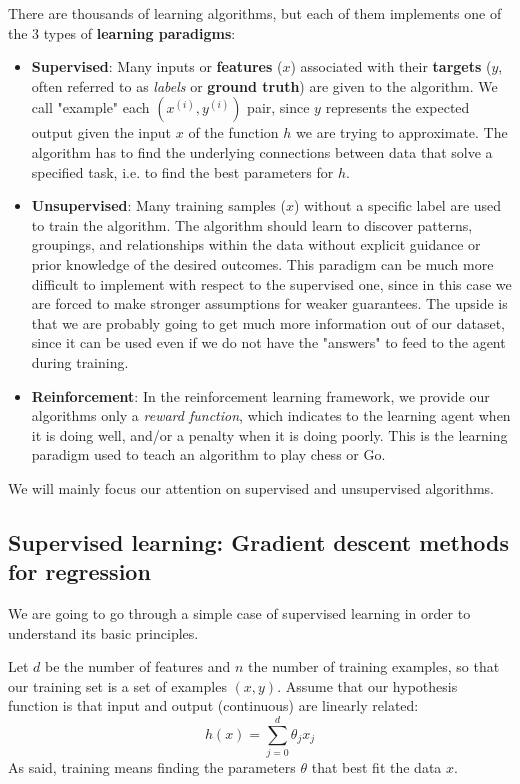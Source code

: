 There are thousands of learning algorithms, but each of them implements one of the 3 types of \textbf{learning paradigms}:
\begin{itemize}
    \item[-] \textbf{Supervised}: Many inputs or \textbf{features} ($x$) associated with their \textbf{targets} ($y$, often referred to as \textit{labels} or \textbf{ground truth}) are given to the algorithm. We call "example" each $(x^{(i)},y^{(i)})$ pair, since $y$ represents the expected output given the input $x$ of the function $h$ we are trying to approximate. The algorithm has to find the underlying connections between data that solve a specified task, i.e. to find the best parameters for $h$.
    \item[-] \textbf{Unsupervised}: Many training samples ($x$) without a specific label are used to train the algorithm. The algorithm should learn to discover patterns, groupings, and relationships within the data without explicit guidance or prior knowledge of the desired outcomes. This paradigm can be much more difficult to implement with respect to the supervised one, since in this case we are forced to make stronger assumptions for weaker guarantees. The upside is that we are probably going to get much more information out of our dataset, since it can be used even if we do not have the "answers" to feed to the agent during training.
    \item[-] \textbf{Reinforcement}: In the reinforcement learning framework, we provide our algorithms only a \textit{reward function}, which indicates to the learning agent when it is doing well, and/or a penalty when it is doing poorly. This is the learning paradigm used to teach an algorithm to play chess or Go.
\end{itemize}

We will mainly focus our attention on supervised and unsupervised algorithms.

\subsection{Supervised learning: Gradient descent methods for regression}
We are going to go through a simple case of supervised learning in order to understand its basic principles. 

Let $d$ be the number of features and $n$ the number of training examples, so that our training set is a set of examples $(x, y)$. 
Assume that our hypothesis function is that input and output (continuous) are linearly related:
\begin{equation}
h(x) = \sum_{j=0}^{d} \theta_{j} x_{j}
\end{equation}
As said, training means finding the parameters $\theta$ that best fit the data $x$. 

